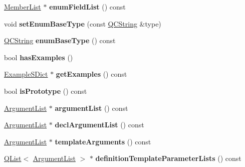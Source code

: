 \begin{DoxyCompactItemize}
\item 
\mbox{\label{class_member_def_a54595f41a5c051786ff6c6e361fdbb92}} 
\mbox{\hyperlink{class_member_list}{Member\+List}} $\ast$ {\bfseries enum\+Field\+List} () const
\item 
\mbox{\label{class_member_def_a0af8a1220c0e6cf8a9c6d1e67ceeea0b}} 
void {\bfseries set\+Enum\+Base\+Type} (const \mbox{\hyperlink{class_q_c_string}{Q\+C\+String}} \&type)
\item 
\mbox{\label{class_member_def_a34d710807f4edd094f22eec0294ba5dd}} 
\mbox{\hyperlink{class_q_c_string}{Q\+C\+String}} {\bfseries enum\+Base\+Type} () const
\item 
\mbox{\label{class_member_def_a6b6db4da94b7ea2945c7d6ca3b09c911}} 
bool {\bfseries has\+Examples} ()
\item 
\mbox{\label{class_member_def_a4aead6b63a3226d8605974f433b0f860}} 
\mbox{\hyperlink{class_example_s_dict}{Example\+S\+Dict}} $\ast$ {\bfseries get\+Examples} () const
\item 
\mbox{\label{class_member_def_a6b98c759a2cdec667807317693f34ffe}} 
bool {\bfseries is\+Prototype} () const
\item 
\mbox{\label{class_member_def_accbbf944bde994ec6a65b38d5d3302b8}} 
\mbox{\hyperlink{class_argument_list}{Argument\+List}} $\ast$ {\bfseries argument\+List} () const
\item 
\mbox{\label{class_member_def_a5f6634b501a2e18ffa8484178bb61306}} 
\mbox{\hyperlink{class_argument_list}{Argument\+List}} $\ast$ {\bfseries decl\+Argument\+List} () const
\item 
\mbox{\label{class_member_def_a13e29253929d478a5b520cb4856bdb3c}} 
\mbox{\hyperlink{class_argument_list}{Argument\+List}} $\ast$ {\bfseries template\+Arguments} () const
\item 
\mbox{\label{class_member_def_a92f9e3d016a19f93962c264c51834a54}} 
\mbox{\hyperlink{class_q_list}{Q\+List}}$<$ \mbox{\hyperlink{class_argument_list}{Argument\+List}} $>$ $\ast$ {\bfseries definition\+Template\+Parameter\+Lists} () const

\end{DoxyCompactItemize}
